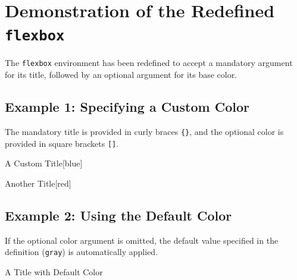 \documentclass[12pt]{book}
\begin{document}
\vspace{1cm}


\section*{Demonstration of the Redefined \texttt{flexbox}}

The \texttt{flexbox} environment has been redefined to accept a mandatory argument for its title, followed by an optional argument for its base color.

\subsection*{Example 1: Specifying a Custom Color}
The mandatory title is provided in curly braces \texttt{\{\}}, and the optional color is provided in square brackets \texttt{[]}.

\begin{flexbox}{A Custom Title}[blue]
  \lipsum[3][1-3]
\end{flexbox}

\begin{flexbox}{Another Title}[red]
  \lipsum[4][1-3]
\end{flexbox}


\subsection*{Example 2: Using the Default Color}
If the optional color argument is omitted, the default value specified in the definition (\texttt{gray}) is automatically applied.

\begin{flexbox}{A Title with Default Color}
  \lipsum[5][1-3]
\end{flexbox}
\end{document}
